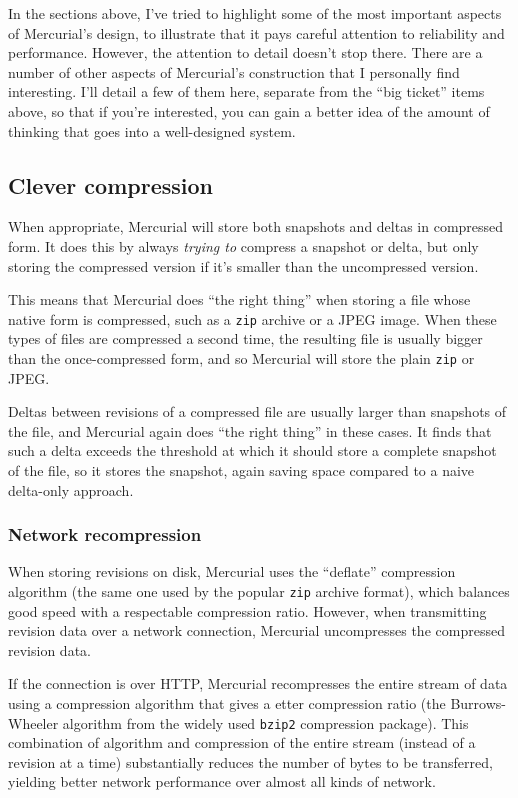 In the sections above, I've tried to highlight some of the most
important aspects of Mercurial's design, to illustrate that it pays
careful attention to reliability and performance.  However, the
attention to detail doesn't stop there.  There are a number of other
aspects of Mercurial's construction that I personally find
interesting.  I'll detail a few of them here, separate from the ``big
ticket'' items above, so that if you're interested, you can gain a
better idea of the amount of thinking that goes into a well-designed
system.

\subsection{Clever compression}

When appropriate, Mercurial will store both snapshots and deltas in
compressed form.  It does this by always \emph{trying to} compress a
snapshot or delta, but only storing the compressed version if it's
smaller than the uncompressed version.

This means that Mercurial does ``the right thing'' when storing a file
whose native form is compressed, such as a \texttt{zip} archive or a
JPEG image.  When these types of files are compressed a second time,
the resulting file is usually bigger than the once-compressed form,
and so Mercurial will store the plain \texttt{zip} or JPEG.

Deltas between revisions of a compressed file are usually larger than
snapshots of the file, and Mercurial again does ``the right thing'' in
these cases.  It finds that such a delta exceeds the threshold at
which it should store a complete snapshot of the file, so it stores
the snapshot, again saving space compared to a naive delta-only
approach.

\subsubsection{Network recompression}

When storing revisions on disk, Mercurial uses the ``deflate''
compression algorithm (the same one used by the popular \texttt{zip}
archive format), which balances good speed with a respectable
compression ratio.  However, when transmitting revision data over a
network connection, Mercurial uncompresses the compressed revision
data.

If the connection is over HTTP, Mercurial recompresses the entire
stream of data using a compression algorithm that gives a etter
compression ratio (the Burrows-Wheeler algorithm from the widely used
\texttt{bzip2} compression package).  This combination of algorithm
and compression of the entire stream (instead of a revision at a time)
substantially reduces the number of bytes to be transferred, yielding
better network performance over almost all kinds of network.

